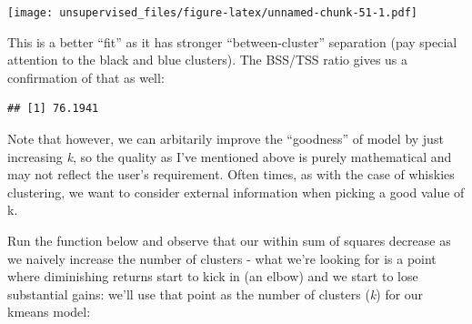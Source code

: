 \documentclass[]{article}
\newenvironment{Shaded}{\begin{snugshade}}{\end{snugshade}}
\newcommand{\CommentTok}[1]{\textcolor[rgb]{0.56,0.35,0.01}{\textit{#1}}}
\newcommand{\ControlFlowTok}[1]{\textcolor[rgb]{0.13,0.29,0.53}{\textbf{#1}}}
\newcommand{\DataTypeTok}[1]{\textcolor[rgb]{0.13,0.29,0.53}{#1}}
\newcommand{\DecValTok}[1]{\textcolor[rgb]{0.00,0.00,0.81}{#1}}
\newcommand{\KeywordTok}[1]{\textcolor[rgb]{0.13,0.29,0.53}{\textbf{#1}}}
\newcommand{\NormalTok}[1]{#1}
\newcommand{\OperatorTok}[1]{\textcolor[rgb]{0.81,0.36,0.00}{\textbf{#1}}}
\newcommand{\StringTok}[1]{\textcolor[rgb]{0.31,0.60,0.02}{#1}}
\begin{document}
\texttt{[image: unsupervised\_files/figure-latex/unnamed-chunk-51-1.pdf]}

This is a better ``fit'' as it has stronger ``between-cluster''
separation (pay special attention to the black and blue clusters). The
BSS/TSS ratio gives us a confirmation of that as well:

\begin{Shaded}
\end{Shaded}

\begin{verbatim}
## [1] 76.1941
\end{verbatim}

Note that however, we can arbitarily improve the ``goodness'' of model
by just increasing \emph{k}, so the quality as I've mentioned above is
purely mathematical and may not reflect the user's requirement. Often
times, as with the case of whiskies clustering, we want to consider
external information when picking a good value of k.

Run the function below and observe that our within sum of squares
decrease as we naively increase the number of clusters - what we're
looking for is a point where diminishing returns start to kick in (an
elbow) and we start to lose substantial gains: we'll use that point as
the number of clusters (\emph{k}) for our kmeans model:

\begin{Shaded}
\end{Shaded}
\end{document}
